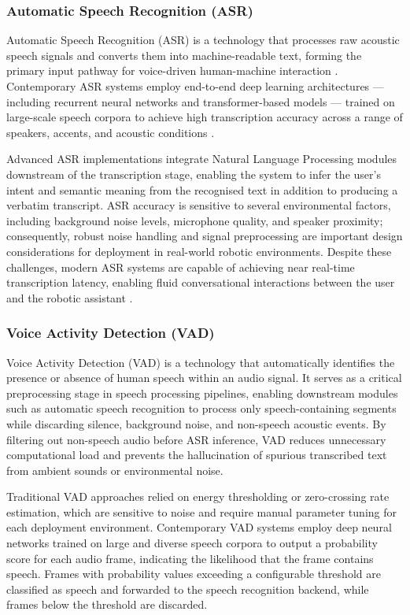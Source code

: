 \subsubsection{Automatic Speech Recognition (ASR)}

Automatic Speech Recognition (ASR) is a technology that processes raw acoustic speech signals and converts them into machine-readable text, forming the primary input pathway for voice-driven human-machine interaction \cite{chazen}. Contemporary ASR systems employ end-to-end deep learning architectures — including recurrent neural networks and transformer-based models — trained on large-scale speech corpora to achieve high transcription accuracy across a range of speakers, accents, and acoustic conditions \cite{sonix2024}.

Advanced ASR implementations integrate Natural Language Processing modules downstream of the transcription stage, enabling the system to infer the user's intent and semantic meaning from the recognised text in addition to producing a verbatim transcript. ASR accuracy is sensitive to several environmental factors, including background noise levels, microphone quality, and speaker proximity; consequently, robust noise handling and signal preprocessing are important design considerations for deployment in real-world robotic environments. Despite these challenges, modern ASR systems are capable of achieving near real-time transcription latency, enabling fluid conversational interactions between the user and the robotic assistant \cite{milvus_docs}.

\subsubsection{Voice Activity Detection (VAD)}

Voice Activity Detection (VAD) is a technology that automatically identifies the presence or absence of human speech within an audio signal. It serves as a critical preprocessing stage in speech processing pipelines, enabling downstream modules such as automatic speech recognition to process only speech-containing segments while discarding silence, background noise, and non-speech acoustic events. By filtering out non-speech audio before ASR inference, VAD reduces unnecessary computational load and prevents the hallucination of spurious transcribed text from ambient sounds or environmental noise.

Traditional VAD approaches relied on energy thresholding or zero-crossing rate estimation, which are sensitive to noise and require manual parameter tuning for each deployment environment. Contemporary VAD systems employ deep neural networks trained on large and diverse speech corpora to output a probability score for each audio frame, indicating the likelihood that the frame contains speech. Frames with probability values exceeding a configurable threshold are classified as speech and forwarded to the speech recognition backend, while frames below the threshold are discarded.

